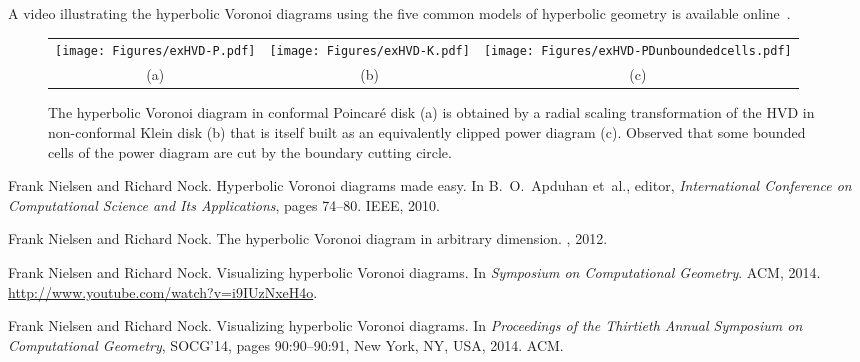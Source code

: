 \documentclass[12pt]{article}
\begin{document}
A video illustrating the hyperbolic Voronoi diagrams using the five common models of hyperbolic geometry is available online~\cite{HVDvideo}. 
 
\begin{figure}\centering
\begin{tabular}{ccc}
\texttt{[image: Figures/exHVD-P.pdf]} &
\texttt{[image: Figures/exHVD-K.pdf]} &
\texttt{[image: Figures/exHVD-PDunboundedcells.pdf]} 
\\
(a) & (b) & (c)
\end{tabular}
\caption{The hyperbolic Voronoi diagram in conformal Poincar\'e disk (a) is obtained by a radial scaling transformation of the HVD in non-conformal Klein disk (b) that is itself built as an equivalently clipped power diagram (c). Observed that some bounded cells of the power diagram are cut by the boundary cutting circle.
}\label{fig:clipping}\end{figure}
 
 
\nocite{*}

 

 

 
\begin{thebibliography}{1}

Frank Nielsen and Richard Nock.
\newblock Hyperbolic {V}oronoi diagrams made easy.
\newblock In B.~O.~Apduhan et~al., editor, {\em International Conference on
  Computational Science and Its Applications}, pages 74--80. IEEE, 2010.

Frank Nielsen and Richard Nock.
\newblock The hyperbolic {V}oronoi diagram in arbitrary dimension.
, 2012.

Frank Nielsen and Richard Nock.
\newblock Visualizing hyperbolic {V}oronoi diagrams.
\newblock In {\em Symposium on Computational Geometry}. ACM, 2014.
\newblock \url{http://www.youtube.com/watch?v=i9IUzNxeH4o}.

Frank Nielsen and Richard Nock.
\newblock Visualizing hyperbolic {V}oronoi diagrams.
\newblock In {\em Proceedings of the Thirtieth Annual Symposium on
  Computational Geometry}, SOCG'14, pages 90:90--90:91, New York, NY, USA,
  2014. ACM.

\end{thebibliography}
\end{document}
